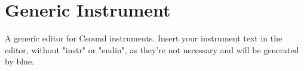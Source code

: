 \section{Generic Instrument}\label{genericInstrument}

A generic editor for Csound instruments. Insert your instrument text in
the editor, without "instr" or "endin", as they're not necessary and
will be generated by blue.
